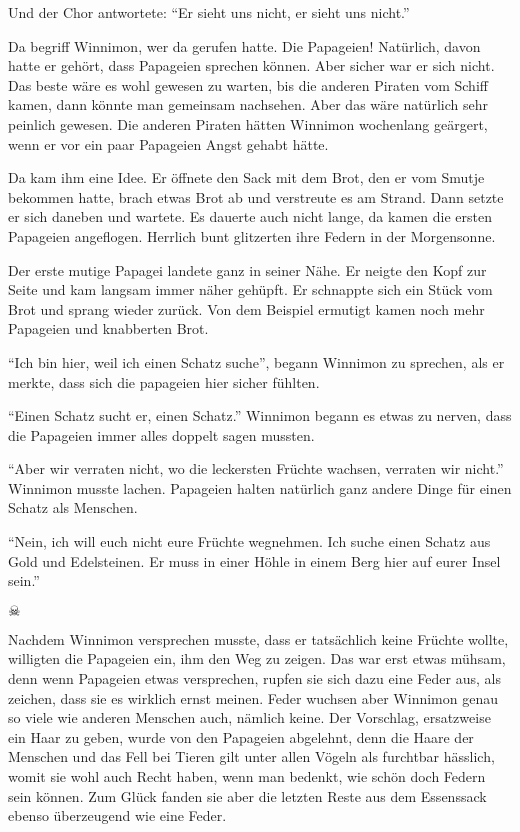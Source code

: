 Und der Chor antwortete: \enquote{Er sieht uns nicht, er sieht uns nicht.}

Da begriff Winnimon, wer da gerufen hatte. Die Papageien! Natürlich, davon hatte er gehört, dass Papageien sprechen können. Aber sicher war er sich nicht. Das beste wäre es wohl gewesen zu warten, bis die anderen Piraten vom Schiff kamen, dann könnte man gemeinsam nachsehen. Aber das wäre natürlich sehr peinlich gewesen. Die anderen Piraten hätten Winnimon wochenlang geärgert, wenn er vor ein paar Papageien Angst gehabt hätte. 

Da kam ihm eine Idee. Er öffnete den Sack mit dem Brot, den er vom Smutje bekommen hatte, brach etwas Brot ab und verstreute es am Strand. Dann setzte er sich daneben und wartete. Es dauerte auch nicht lange, da kamen die ersten Papageien angeflogen. Herrlich bunt glitzerten ihre Federn in der Morgensonne.

Der erste mutige Papagei landete ganz in seiner Nähe. Er neigte den Kopf zur Seite und kam langsam immer näher gehüpft. Er schnappte sich ein Stück vom Brot und sprang wieder zurück. Von dem Beispiel ermutigt kamen noch mehr Papageien und knabberten Brot. 

\enquote{Ich bin hier, weil ich einen Schatz suche}, begann Winnimon zu sprechen, als er merkte, dass sich die papageien hier sicher fühlten. 

\enquote{Einen Schatz sucht er, einen Schatz.} Winnimon begann es etwas zu nerven, dass die Papageien immer alles doppelt sagen mussten.

\enquote{Aber wir verraten nicht, wo die leckersten Früchte wachsen, verraten wir nicht.} Winnimon musste lachen. Papageien halten natürlich ganz andere Dinge für einen Schatz als Menschen.

\enquote{Nein, ich will euch nicht eure Früchte wegnehmen. Ich suche einen Schatz aus Gold und Edelsteinen. Er muss in einer Höhle in einem Berg hier auf eurer Insel sein.}

\begin{center}
{ $\skull$}
\end{center}

Nachdem Winnimon versprechen musste, dass er tatsächlich keine Früchte wollte, willigten die Papageien ein, ihm den Weg zu zeigen. Das war erst etwas mühsam, denn wenn Papageien etwas versprechen, rupfen sie sich dazu eine Feder aus, als zeichen, dass sie es wirklich ernst meinen. Feder wuchsen aber Winnimon genau so viele wie anderen Menschen auch, nämlich keine. Der Vorschlag, ersatzweise ein Haar zu geben, wurde von den Papageien abgelehnt, denn die Haare der Menschen und das Fell bei Tieren gilt unter allen Vögeln als furchtbar hässlich, womit sie wohl auch Recht haben, wenn man bedenkt, wie schön doch Federn sein können. Zum Glück fanden sie aber die letzten Reste aus dem Essenssack ebenso überzeugend wie eine Feder. 


